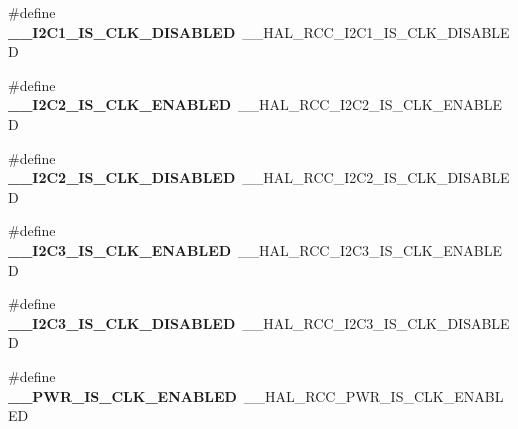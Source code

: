 \begin{DoxyCompactItemize}
\item 
\hypertarget{group___h_a_l___r_c_c___aliased_gadd1e2d944945531b64d71bf9e261a777}{\#define {\bfseries \-\_\-\-\_\-\-I2\-C1\-\_\-\-I\-S\-\_\-\-C\-L\-K\-\_\-\-D\-I\-S\-A\-B\-L\-E\-D}~\-\_\-\-\_\-\-H\-A\-L\-\_\-\-R\-C\-C\-\_\-\-I2\-C1\-\_\-\-I\-S\-\_\-\-C\-L\-K\-\_\-\-D\-I\-S\-A\-B\-L\-E\-D}\label{group___h_a_l___r_c_c___aliased_gadd1e2d944945531b64d71bf9e261a777}

\item 
\hypertarget{group___h_a_l___r_c_c___aliased_ga06cc90a44300051aaa95e148297f3172}{\#define {\bfseries \-\_\-\-\_\-\-I2\-C2\-\_\-\-I\-S\-\_\-\-C\-L\-K\-\_\-\-E\-N\-A\-B\-L\-E\-D}~\-\_\-\-\_\-\-H\-A\-L\-\_\-\-R\-C\-C\-\_\-\-I2\-C2\-\_\-\-I\-S\-\_\-\-C\-L\-K\-\_\-\-E\-N\-A\-B\-L\-E\-D}\label{group___h_a_l___r_c_c___aliased_ga06cc90a44300051aaa95e148297f3172}

\item 
\hypertarget{group___h_a_l___r_c_c___aliased_ga2c2789ff86b604021d9f66c2f689babb}{\#define {\bfseries \-\_\-\-\_\-\-I2\-C2\-\_\-\-I\-S\-\_\-\-C\-L\-K\-\_\-\-D\-I\-S\-A\-B\-L\-E\-D}~\-\_\-\-\_\-\-H\-A\-L\-\_\-\-R\-C\-C\-\_\-\-I2\-C2\-\_\-\-I\-S\-\_\-\-C\-L\-K\-\_\-\-D\-I\-S\-A\-B\-L\-E\-D}\label{group___h_a_l___r_c_c___aliased_ga2c2789ff86b604021d9f66c2f689babb}

\item 
\hypertarget{group___h_a_l___r_c_c___aliased_ga02be11fc2d70c7132b634b27595cf577}{\#define {\bfseries \-\_\-\-\_\-\-I2\-C3\-\_\-\-I\-S\-\_\-\-C\-L\-K\-\_\-\-E\-N\-A\-B\-L\-E\-D}~\-\_\-\-\_\-\-H\-A\-L\-\_\-\-R\-C\-C\-\_\-\-I2\-C3\-\_\-\-I\-S\-\_\-\-C\-L\-K\-\_\-\-E\-N\-A\-B\-L\-E\-D}\label{group___h_a_l___r_c_c___aliased_ga02be11fc2d70c7132b634b27595cf577}

\item 
\hypertarget{group___h_a_l___r_c_c___aliased_gad11394fc5ca1e4456726571e5f35db88}{\#define {\bfseries \-\_\-\-\_\-\-I2\-C3\-\_\-\-I\-S\-\_\-\-C\-L\-K\-\_\-\-D\-I\-S\-A\-B\-L\-E\-D}~\-\_\-\-\_\-\-H\-A\-L\-\_\-\-R\-C\-C\-\_\-\-I2\-C3\-\_\-\-I\-S\-\_\-\-C\-L\-K\-\_\-\-D\-I\-S\-A\-B\-L\-E\-D}\label{group___h_a_l___r_c_c___aliased_gad11394fc5ca1e4456726571e5f35db88}

\item 
\hypertarget{group___h_a_l___r_c_c___aliased_ga25e09e85ad3b2897d98591413f859a92}{\#define {\bfseries \-\_\-\-\_\-\-P\-W\-R\-\_\-\-I\-S\-\_\-\-C\-L\-K\-\_\-\-E\-N\-A\-B\-L\-E\-D}~\-\_\-\-\_\-\-H\-A\-L\-\_\-\-R\-C\-C\-\_\-\-P\-W\-R\-\_\-\-I\-S\-\_\-\-C\-L\-K\-\_\-\-E\-N\-A\-B\-L\-E\-D}\label{group___h_a_l___r_c_c___aliased_ga25e09e85ad3b2897d98591413f859a92}


\end{DoxyCompactItemize}
